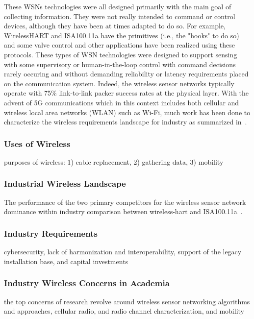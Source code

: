 {These WSNs technologies were all designed primarily with the main goal of collecting information.  They were not really intended to command or control devices, although they have been at times adapted to do so.  For example, WirelessHART and ISA100.11a have the primitives (i.e., the "hooks" to do so) and some valve control and other applications have been realized using these protocols.  These types of WSN technologies were designed to support sensing with some supervisory or human-in-the-loop control with command decisions rarely occuring and without demanding reliability or latency requirements placed on the communication system.  Indeed, the wireless sensor networks typically operate with 75\% link-to-link packer success rates at the physical layer.  With the advent of 5G communications which in this context includes both cellular and wireless local area networks (WLAN) such as Wi-Fi, much work has been done to characterize the wireless requirements landscape for industry as summarized in~\cite{Montgomery2019}.

\subsubsection{Uses of Wireless}
purposes of wireless: 1) cable replacement, 2) gathering data, 3) mobility

\subsubsection{Industrial Wireless Landscape}

The performance of the two primary competitors for the wireless sensor network dominance within industry comparison between wireless-hart and ISA100.11a~\cite{wang2011, nixoncomparison}.  

\subsubsection{Industry Requirements}
cybersecurity, lack of harmonization and interoperability, support of the legacy installation base, and capital investments

\subsubsection{Industry Wireless Concerns in Academia}
the top concerns of research revolve around wireless sensor networking algorithms and approaches, cellular radio, and radio channel characterization, and mobility

}
